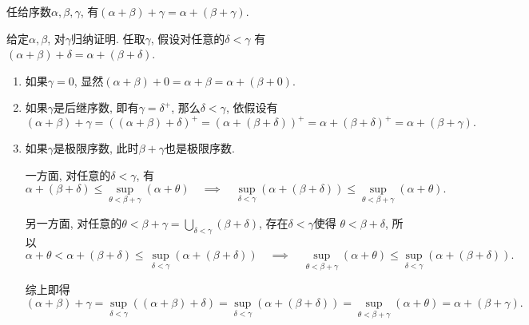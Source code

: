 \documentclass[UTF8]{ctexart}
\begin{document}
任给序数$\alpha,\beta,\gamma$, 有$(\alpha+\beta)+\gamma=\alpha+(\beta+\gamma)$.


给定$\alpha,\beta$, 对$\gamma$归纳证明. 任取$\gamma$, 假设对任意的$\delta<\gamma$
有$(\alpha+\beta)+\delta=\alpha+(\beta+\delta)$.

\begin{enumerate}
    \item 如果$\gamma=0$, 显然$(\alpha+\beta)+0=\alpha+\beta=\alpha+(\beta+0)$.
    
    \vspace{3pt}
    \item 如果$\gamma$是后继序数, 即有$\gamma=\delta^+$, 那么$\delta<\gamma$,
    依假设有
    \[
        (\alpha+\beta)+\gamma=((\alpha+\beta)+\delta)^+=
        (\alpha+(\beta+\delta))^+=\alpha+(\beta+\delta)^+=\alpha+(\beta+\gamma).
    \]

    \vspace{3pt}
    \item 如果$\gamma$是极限序数, 此时$\beta+\gamma$也是极限序数.
    
    \vspace{3pt}\hspace{2.17em}
    一方面, 对任意的$\delta<\gamma$, 有
    \vspace{3pt}
    \[
        \alpha+(\beta+\delta)\leqslant
        \sup_{\theta<\beta+\gamma}(\alpha+\theta)\quad\implies\quad
        \sup_{\delta<\gamma}(\alpha+(\beta+\delta))\leqslant
        \sup_{\theta<\beta+\gamma}(\alpha+\theta).
    \]

    \vspace{3pt}\hspace{2.17em}
    另一方面, 对任意的$\displaystyle\theta<\beta+\gamma=
    \bigcup_{\delta<\gamma}(\beta+\delta)$, 存在$\delta<\gamma$使得
    $\theta<\beta+\delta$, 所以
    \vspace{3pt}
    \[
        \alpha+\theta<\alpha+(\beta+\delta)\leqslant\,
        \sup_{\delta<\gamma}(\alpha+(\beta+\delta))\quad\implies\quad
        \sup_{\theta<\beta+\gamma}(\alpha+\theta)\leqslant
        \sup_{\delta<\gamma}(\alpha+(\beta+\delta)).
    \]

    \hspace{2.17em}
    综上即得
    \begin{equation*}
        (\alpha+\beta)+\gamma=\sup_{\delta<\gamma}((\alpha+\beta)+\delta)=
        \sup_{\delta<\gamma}(\alpha+(\beta+\delta))=
        \sup_{\theta<\beta+\gamma}(\alpha+\theta)=\alpha+(\beta+\gamma).
    \tag*{\qedsymbol}\end{equation*}
\end{enumerate}
\end{document}
